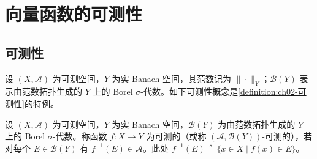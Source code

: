 \documentclass[../../main.tex]{subfiles}%
\begin{document}
\section{向量函数的可测性}\label{section:ch04-可测性}

\subsection{可测性}\label{subsection:ch04-可测性}

设 $(X,\mathcal{A})$ 为可测空间，$Y$ 为实 Banach 空间，其范数记为 $\|\cdot\|_Y$；$\mathcal{B}(Y)$ 表示由范数拓扑生成的 $Y$ 上的 Borel $\sigma$-代数。如下可测性概念是\cref{definition:ch02-可测性}的特例。

\begin{definition}[向量函数的可测性]\label{definition:ch04-可测性}
设 $(X,\mathcal{A})$ 为可测空间，$Y$ 为实 Banach 空间，$\mathcal{B}(Y)$ 为由范数拓扑生成的 $Y$ 上的 Borel $\sigma$-代数。称函数 $f:X\to Y$ 为可测的（或称 $(\mathcal{A},\mathcal{B}(Y))$-可测的），若对每个 $E\in\mathcal{B}(Y)$ 有 $f^{-1}(E)\in\mathcal{A}$。此处 $f^{-1}(E)\triangleq\{x\in X\mid f(x)\in E\}$。
\end{definition}
\end{document}
